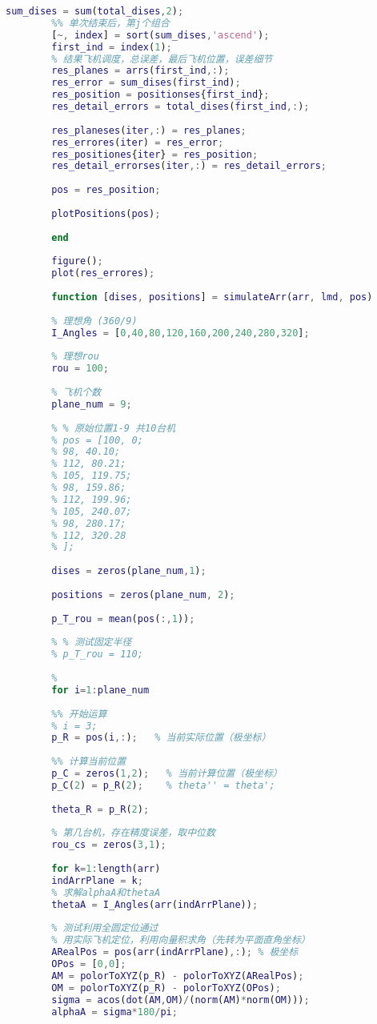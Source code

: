 \documentclass{cumcmthesis}
\begin{document}
\begin{appendices}
\begin{lstlisting}[language=matlab]
		sum_dises = sum(total_dises,2);
		%% 单次结束后，第j个组合
		[~, index] = sort(sum_dises,'ascend');
		first_ind = index(1);
		% 结果飞机调度，总误差，最后飞机位置，误差细节
		res_planes = arrs(first_ind,:);
		res_error = sum_dises(first_ind);
		res_position = positionses{first_ind};
		res_detail_errors = total_dises(first_ind,:);
		
		res_planeses(iter,:) = res_planes;
		res_errores(iter) = res_error;
		res_positiones{iter} = res_position;
		res_detail_errorses(iter,:) = res_detail_errors;
		
		pos = res_position;
		
		plotPositions(pos);
		
		end
		
		figure();
		plot(res_errores);
		
		function [dises, positions] = simulateArr(arr, lmd, pos)
		
		% 理想角 (360/9)
		I_Angles = [0,40,80,120,160,200,240,280,320];
		
		% 理想rou
		rou = 100;
		
		% 飞机个数
		plane_num = 9;
		
		% % 原始位置1-9 共10台机
		% pos = [100, 0;
		% 98, 40.10;
		% 112, 80.21;
		% 105, 119.75;
		% 98, 159.86;
		% 112, 199.96;
		% 105, 240.07;
		% 98, 280.17;
		% 112, 320.28
		% ];
		
		dises = zeros(plane_num,1);
		
		positions = zeros(plane_num, 2);
		
		p_T_rou = mean(pos(:,1));
		
		% % 测试固定半径
		% p_T_rou = 110;
		
		%
		for i=1:plane_num
		
		%% 开始运算
		% i = 3;
		p_R = pos(i,:);   % 当前实际位置（极坐标）
		
		%% 计算当前位置
		p_C = zeros(1,2);   % 当前计算位置（极坐标）
		p_C(2) = p_R(2);    % theta'' = theta';
		
		theta_R = p_R(2);
		
		% 第几台机，存在精度误差，取中位数
		rou_cs = zeros(3,1);
		
		for k=1:length(arr)
		indArrPlane = k;
		% 求解alphaA和thetaA
		thetaA = I_Angles(arr(indArrPlane));
		
		% 测试利用全圆定位通过
		% 用实际飞机定位，利用向量积求角（先转为平面直角坐标）
		ARealPos = pos(arr(indArrPlane),:); % 极坐标
		OPos = [0,0];
		AM = polorToXYZ(p_R) - polorToXYZ(ARealPos);
		OM = polorToXYZ(p_R) - polorToXYZ(OPos);
		sigma = acos(dot(AM,OM)/(norm(AM)*norm(OM)));
		alphaA = sigma*180/pi;
		

\end{lstlisting}
\end{appendices}
\end{document}
